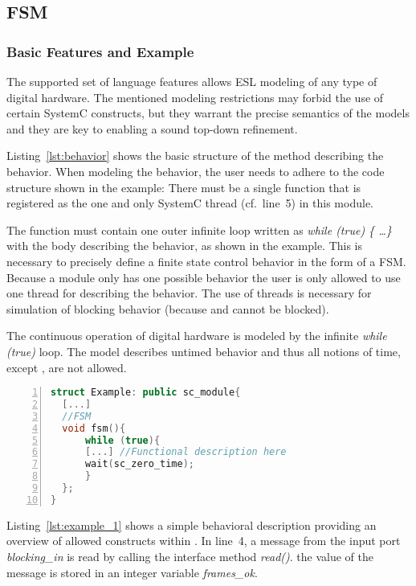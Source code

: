 \subsection{FSM}
\label{section:FSM}

\subsubsection{Basic Features and Example}
\label{sec:fsm-basic}

The supported set of language features allows ESL modeling of
any type of digital hardware. %
The mentioned modeling restrictions may forbid the use of certain SystemC constructs, but they warrant the precise semantics of the models and they are key to enabling a sound top-down refinement. %

Listing~\ref{lst:behavior} shows the basic structure of the method
describing the behavior. %
When modeling the behavior, the user needs to adhere to the code
structure shown in the example: %
There must be a single function that is registered as the one and only
SystemC thread (cf.~line~5) in this module. %

The function must contain one outer infinite loop written as
\textit{\small while (true) \{ \ldots \}} with the body describing the
behavior, as shown in the example. %
This is necessary to precisely define a finite state control behavior
in the form of a FSM. %
Because a module only has one possible behavior the user is only
allowed to use one thread for describing the behavior. %
  The use of threads is necessary for simulation of blocking behavior
  (because  and  cannot be
  blocked). %

The continuous operation of digital hardware is modeled by the
infinite \textit{\small while (true)} loop. %
The model describes untimed behavior and thus all notions of time,
except , are not allowed. %
\newpage
\begin{lstlisting}[language=C++,
caption={Behavior description},
label={lst:behavior},
numbers=left,
captionpos=b,   
basicstyle={\footnotesize},
xleftmargin=5.0ex]
struct Example: public sc_module{
  [...]
  //FSM
  void fsm(){
      while (true){
      [...] //Functional description here 
      wait(sc_zero_time);
      }
  };
}
\end{lstlisting}

Listing~\ref{lst:example_1} shows a simple behavioral description
providing an overview of allowed constructs within \SYSTEMCPPA{}. %
In line~4, a message from the input port \textit{blocking\_in} is read
by calling the interface method \textit{read()}. %
the value of the message is stored in an integer variable \textit{frames\_ok}. %

